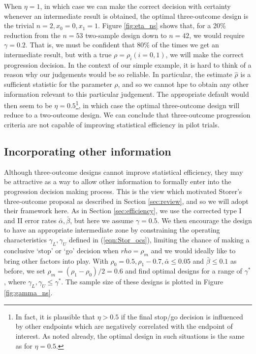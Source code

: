 \documentclass[Crown, times, sagev]{sagej}
\begin{document}
When $\eta = 1$, in which case we can make the correct decision with certainty whenever an intermediate result is obtained, the optimal three-outcome design is the trivial $n = 2, x_0 = 0, x_1 = 1$. Figure \ref{fig:eta_ns} shows that, for a 20\% reduction from the $n = 53$ two-sample design down to $n = 42$, we would require $\gamma = 0.2$. That is, we must be confident that 80\% of the times we get an intermediate result, but with a true $\rho = \rho_i (i = 0,1)$, we will make the correct progression decision. In the context of our simple example, it is hard to think of a reason why our judgements would be so reliable. In particular, the estimate $\hat{\rho}$ is a sufficient statistic for the parameter $\rho$, and so we cannot hpe to obtain any other information relevant to this particular judgement. The appropriate default would then seem to be $\eta = 0.5$\footnote{In fact, it is plausible that $\eta > 0.5$ if the final stop/go decision is influenced by other endpoints which are negatively correlated with the endpoint of interest. As noted already, the optimal design in such situations is the same as for $\eta = 0.5$.}, in which case the optimal three-outcome design will reduce to a two-outcome design. We can conclude that three-outcome progression criteria are not capable of improving statistical efficiency in pilot trials.

\subsection{Incorporating other information}\label{sec:information}

Although three-outcome designs cannot improve statistical efficiency, they may be attractive as a way to allow other information to formally enter into the progression decision making process. This is the view which motivated Storer's three-outcome proposal \cite{Storer1992} as described in Section \ref{sec:review}, and so we will adopt their framework here. As in Section \ref{sec:efficiency}, we use the corrected type I and II error rates $\bar{\alpha}, \bar{\beta}$, but here we assume $\gamma = 0.5$. We then encourage the design to have an appropriate intermediate zone by constraining the operating characteristics $\gamma_L, \gamma_U$ defined in (\ref{eqn:Stor_ocs}), limiting the chance of making a conclusive `stop' or `go' decision when $rho = \rho_m$ and we would ideally like to bring other factors into play. With $\rho_0 = 0.5, \rho_1 - 0.7, \bar{\alpha} \leq 0.05$ and $\bar{\beta} \leq 0.1$ as before, we set $\rho_m = (\rho_1 - \rho_0)/2 = 0.6$ and find optimal designs for a range of $\gamma^*$, where $\gamma_L, \gamma_U \leq \gamma^*$. The sample size of these designs is plotted in Figure \ref{fig:gamma_ns}.
\end{document}
